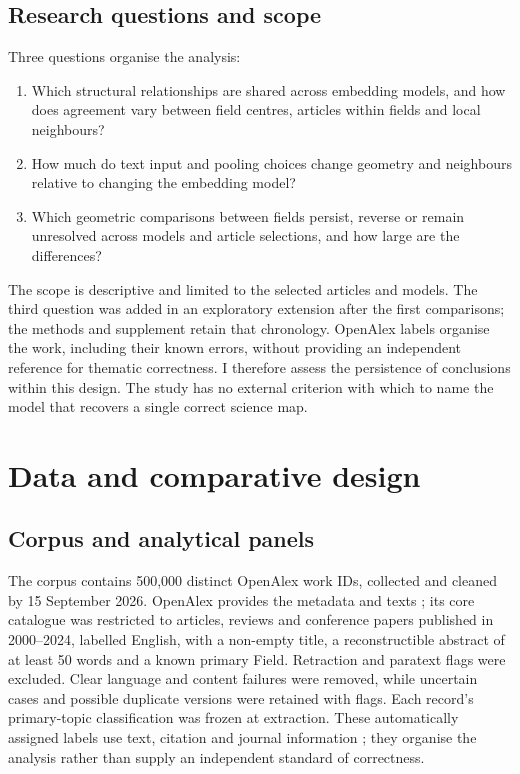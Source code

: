 \documentclass[12pt]{article}
\begin{document}
\subsection{Research questions and scope}
Three questions organise the analysis:

\begin{enumerate}
\item[\textbf{RQ1.}] Which structural relationships are shared across embedding models, and how does agreement vary between field centres, articles within fields and local neighbours?
\item[\textbf{RQ2.}] How much do text input and pooling choices change geometry and neighbours relative to changing the embedding model?
\item[\textbf{RQ3.}] Which geometric comparisons between fields persist, reverse or remain unresolved across models and article selections, and how large are the differences?
\end{enumerate}

The scope is descriptive and limited to the selected articles and models. The third question was added in an exploratory extension after the first comparisons; the methods and supplement retain that chronology. OpenAlex labels organise the work, including their known errors, without providing an independent reference for thematic correctness. I therefore assess the persistence of conclusions within this design. The study has no external criterion with which to name the model that recovers a single correct science map.


\section{Data and comparative design}
\subsection{Corpus and analytical panels}
The corpus contains 500,000 distinct OpenAlex work IDs, collected and cleaned by 15 September 2026. OpenAlex provides the metadata and texts \citep{priem2022openalex}; its core catalogue was restricted to articles, reviews and conference papers published in 2000--2024, labelled English, with a non-empty title, a reconstructible abstract of at least 50 words and a known primary Field. Retraction and paratext flags were excluded. Clear language and content failures were removed, while uncertain cases and possible duplicate versions were retained with flags. Each record's primary-topic classification was frozen at extraction. These automatically assigned labels use text, citation and journal information \citep{openalex2026topics}; they organise the analysis rather than supply an independent standard of correctness.
\end{document}
